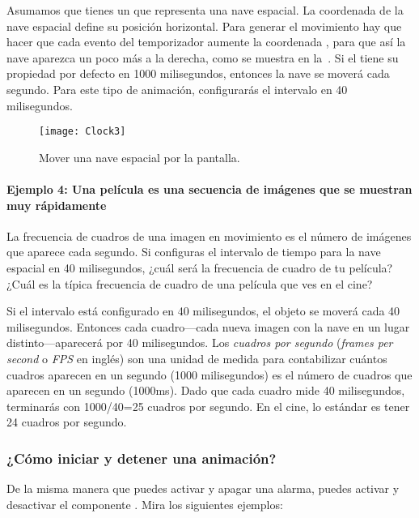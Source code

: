 {{Asumamos que tienes un  que representa una
nave espacial. La coordenada  de la nave espacial define
su posición horizontal. Para generar el movimiento hay que hacer que
cada evento del temporizador aumente la coordenada , para
que así la nave aparezca un poco más a la derecha, como se muestra en
la~. Si el  tiene
su propiedad por defecto en 1000 milisegundos, entonces la nave se
moverá cada segundo. Para este tipo de animación, configurarás el
intervalo en 40 milisegundos.

\begin{figure}[H]
\centering
\texttt{[image: Clock3]}
\caption{Mover una nave espacial por la pantalla.}
\label{fig:Clock3}
\end{figure}

\paragraph{Ejemplo 4: Una película es una secuencia de imágenes que se
  muestran muy rápidamente}

La frecuencia de cuadros de una imagen en movimiento es el número de
imágenes que aparece cada segundo. Si configuras el intervalo de
tiempo para la nave espacial en 40 milisegundos, ¿cuál será la
frecuencia de cuadro de tu película? ¿Cuál es la típica frecuencia de
cuadro de una película que ves en el cine?}

Si el intervalo está configurado en 40 milisegundos, el objeto se moverá cada 40 milisegundos.
Entonces cada cuadro---cada nueva imagen con la nave en un lugar
distinto---aparecerá por 40 milisegundos. Los \emph{cuadros por
  segundo} (\emph{frames per second} o \emph{FPS} en inglés) son una unidad de medida para contabilizar cuántos cuadros
aparecen en un segundo (1000 milisegundos) es el número de
cuadros que aparecen en un segundo (1000ms). Dado que cada cuadro mide
40 milisegundos, terminarás con 1000/40=25 cuadros por segundo. En el
cine, lo estándar es tener 24 cuadros por segundo.

\subsubsection*{¿Cómo iniciar y detener una animación?}

De la misma manera que puedes activar y apagar una alarma, puedes
activar y desactivar el componente . Mira los
siguientes ejemplos:

}
